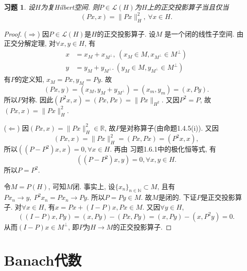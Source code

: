 \documentclass[UTF8,twoside]{ctexbook}
\newtheorem{exercise}{习题}[section]
\newcommand{\h}{\mathscr}
\newcommand{\kx}{\mathbb}
\numberwithin{equation}{section}
\begin{document}
	\begin{exercise}
		设$H$为复Hilbert空间. 则$P\in\h L(H)$为$H$上的正交投影算子当且仅当
		\[
		(Px,x)=\|Px\|_H^2,\ \forall x\in H.
		\]
	\end{exercise}
	\begin{proof}
		($\Rightarrow$) 因$P\in\h L(H)$是$H$的正交投影算子. 设$M$ 是一个闭的线性子空间. 由正交分解定理, 对$\forall x,y\in H$, 有
		\[
		\begin{aligned}
		x&=x_M+x_{M^\bot},\  (x_M\in M, x_{M^\bot}\in M^\bot)\\
		y&=y_M+y_{M^\bot}.\  (y_M\in M, y_{M^\bot}\in M^{\bot})
		\end{aligned}
		\]
		有$P$的定义知, $x_M=Px,y_M=Py$. 故
		\[
		(Px,y)=(x_M,y_M+y_{M^\bot})=(x_m,y_m)=(x,Py).
		\]
		所以$P$对称. 因此$(P^2x,x)=(Px,Px)=\|Px\|_{H^2}$. 又因$P^2=P$, 故$(Px,x)=\|Px\|_H^2$.

		($\Leftarrow$) 因$(Px,x)=\|Px\|_H^2\in\kx R$, 故$P$是对称算子(由命题1.4.5(i)). 又因
		\[
		(Px,x)=\|Px\|_H^2=(Px,Px)=(P^2x,x),
		\]
		所以$((P-P^2)x,x)=0,\forall x\in H$. 再由\cite{zgq1990} 习题1.6.1中的极化恒等式, 有
		\[
		((P-P^2)x,y)=0,\forall x,y\in H.
		\]
		所以$P=P^2$.

		令$M=P(H)$, 可知$M$闭. 事实上, 设$\{x_n\}_{n\in\kx N}\subset M$, 且有$Px_n\rightarrow y,\ P^2x_n=Px_n\rightarrow Py$. 所以$P=Py\in M$. 故$M$是闭的. 下证$P$是正交投影算子. 对$\forall x\in H$, 有$x=Px+(I-P)x, Px\in M$. 又因$\forall y\in H$,
		\[
		((I-P)x,Py)=(x,Py)-(Px,Py)=(x,Py)-(x,P^2y)=0.
		\]
		从而$(I-P)x\in M^\bot$, 即$P$为$H\rightarrow M$的正交投影算子.

	\end{proof}
	\chapter{Banach代数}
\end{document}

